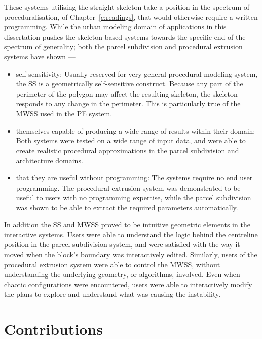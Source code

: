 These systems utilising the straight skeleton take a position in the spectrum of proceduralisation, of Chapter~\ref{c:readings}, that would otherwise require a written programming. While the urban modeling domain of applications in this dissertation pushes the skeleton based systems towards the specific end of the spectrum of generality; both the parcel subdivision and procedural extrusion systems have shown ---

\begin{itemize}

\item{self sensitivity: Usually reserved for very general procedural modeling system, the SS is a geometrically self-sensitive construct. Because any part of the perimeter of the polygon may affect the resulting skeleton, the skeleton responds to any change in the perimeter. This is particularly true of the MWSS used in the PE system.}

\item{themselves capable of producing a wide range of results within their domain: Both systems were tested on a wide range of input data, and were able to create realistic procedural approximations in the parcel subdivision and architecture domains.}

\item{that they are useful without programming: The systems require no end user programming. The procedural extrusion system was demonstrated to be useful to users with no programming expertise, while the parcel subdivision was shown to be able to extract the required parameters automatically.}

\end{itemize}

In addition the SS and MWSS proved to be intuitive geometric elements in the interactive systems. Users were able to understand the logic behind the centreline position in the parcel subdivision system, and were satisfied with the way it moved when the block's boundary was interactively edited. Similarly, users of the procedural extrusion system were able to control the MWSS, without understanding the underlying geometry, or algorithms, involved. Even when chaotic configurations were encountered, users were able to interactively modify the plans to explore and understand what was causing the instability.


\section{Contributions}

